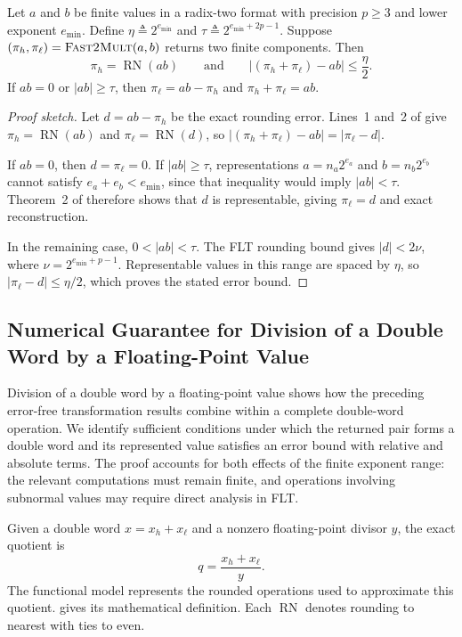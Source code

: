 \begin{theorem}
\label{thm:fast-two-mult}
Let $a$ and $b$ be finite values in a radix-two format with precision
$p\geq3$ and lower exponent $e_{\min}$. Define
$\eta\triangleq2^{e_{\min}}$ and
$\tau\triangleq2^{e_{\min}+2p-1}$.
Suppose $(\pi_h,\pi_\ell)=\textsc{Fast2Mult}{}(a,b)$ returns two finite components.
Then
\[
  \pi_h=\operatorname{RN}(ab)
  \qquad\text{and}\qquad
  \left|(\pi_h+\pi_\ell)-ab\right|\leq\frac{\eta}{2}.
\]
If $ab=0$ or $|ab|\geq\tau$, then
$\pi_\ell=ab-\pi_h$ and $\pi_h+\pi_\ell=ab$.
\end{theorem}

\begin{proof}[Proof sketch]
Let $d=ab-\pi_h$ be the exact rounding error. Lines~1 and~2 of
 give $\pi_h=\operatorname{RN}(ab)$ and
$\pi_\ell=\operatorname{RN}(d)$, so
$|(\pi_h+\pi_\ell)-ab|=|\pi_\ell-d|$.

If $ab=0$, then $d=\pi_\ell=0$. If $|ab|\geq\tau$, representations
$a=n_a2^{e_a}$ and $b=n_b2^{e_b}$ cannot satisfy
$e_a+e_b<e_{\min}$, since that inequality would imply $|ab|<\tau$.
Theorem~2 of \citet[Section~3]{BoldoDaumas2003} therefore shows that $d$ is
representable, giving $\pi_\ell=d$ and exact reconstruction.

In the remaining case, $0<|ab|<\tau$. The FLT rounding bound gives
$|d|<2\nu$, where $\nu=2^{e_{\min}+p-1}$. Representable values in this range
are spaced by $\eta$, so $|\pi_\ell-d|\leq\eta/2$, which proves the stated
error bound.
\end{proof}

\subsection{Numerical Guarantee for Division of a Double Word by a
Floating-Point Value}
\label{sec:division-numerics}

Division of a double word by a floating-point value shows how the preceding
error-free transformation results combine within a complete double-word
operation. We identify sufficient conditions under which the returned pair
forms a double word and its represented value satisfies an error bound with
relative and absolute terms. 
The proof accounts for both effects of the finite exponent
range: the relevant computations must remain finite, and operations involving
subnormal values may require direct analysis in FLT.

Given a double word $x=x_h+x_\ell$ and a nonzero floating-point divisor $y$,
the exact quotient is
\begin{equation}
  q=\frac{x_h+x_\ell}{y}.
  \label{eq:dw-div-exact-quotient}
\end{equation}
The functional model \DWDivFP{} represents the rounded operations used to
approximate this quotient.  gives its mathematical
definition. Each $\operatorname{RN}$ denotes rounding to nearest with ties to even.

